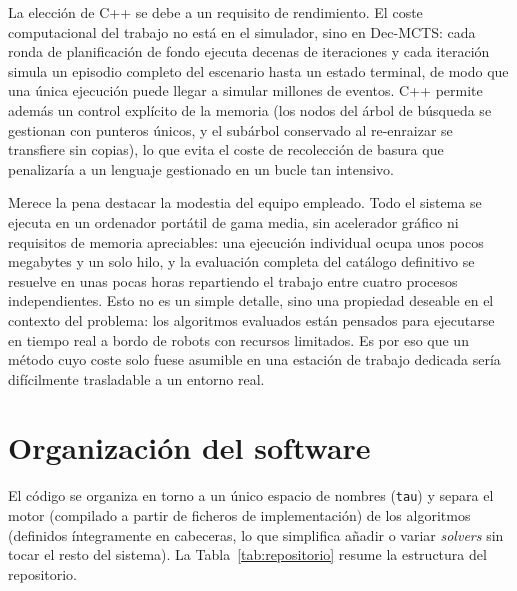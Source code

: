 La elección de C++ se debe a un requisito de rendimiento. El coste computacional del trabajo no está en el simulador, sino en Dec-MCTS: cada ronda de planificación de fondo ejecuta decenas de iteraciones y cada iteración simula un episodio completo del escenario hasta un estado terminal, de modo que una única ejecución puede llegar a simular millones de eventos. C++ permite además un control explícito de la memoria (los nodos del árbol de búsqueda se gestionan con punteros únicos, y el subárbol conservado al re-enraizar se transfiere sin copias), lo que evita el coste de recolección de basura que penalizaría a un lenguaje gestionado en un bucle tan intensivo. 

Merece la pena destacar la modestia del equipo empleado. Todo el sistema se ejecuta en un ordenador portátil de gama media, sin acelerador gráfico ni requisitos de memoria apreciables: una ejecución individual ocupa unos pocos megabytes y un solo hilo, y la evaluación completa del catálogo definitivo se resuelve en unas pocas horas repartiendo el trabajo entre cuatro procesos independientes. Esto no es un simple detalle, sino una propiedad deseable en el contexto del problema: los algoritmos evaluados están pensados para ejecutarse en tiempo real a bordo de robots con recursos limitados. Es por eso que un método cuyo coste solo fuese asumible en una estación de trabajo dedicada sería difícilmente trasladable a un entorno real.

\section{Organización del software} \label{sec:mat-arquitectura}

El código se organiza en torno a un único espacio de nombres (\texttt{tau}) y separa el motor (compilado a partir de ficheros de implementación) de los algoritmos (definidos íntegramente en cabeceras, lo que simplifica añadir o variar \textit{solvers} sin tocar el resto del sistema). La Tabla~\ref{tab:repositorio} resume la estructura del repositorio.

